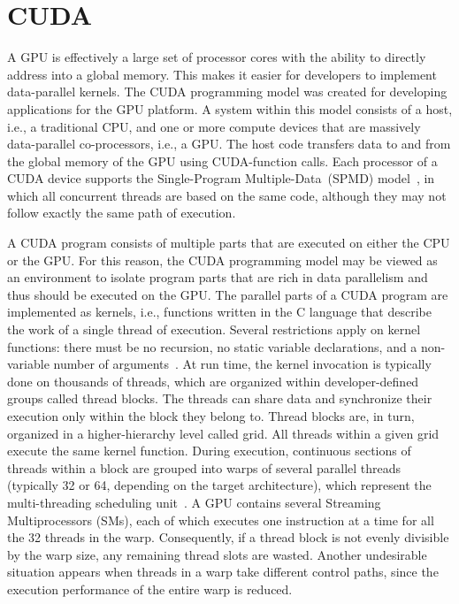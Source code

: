\section{CUDA \label{sec:02-CUDA}}

A GPU is effectively a large set of processor cores with the ability
to directly address into a global memory. This makes it easier for
developers to implement data-parallel kernels. The CUDA programming
model \cite{CUDA} was created for developing applications for the
GPU platform. A system within this model consists of a host, i.e.,
a traditional CPU, and one or more compute devices that are massively
data-parallel co-processors, i.e., a GPU. The host code transfers
data to and from the global memory of the GPU using CUDA-function
calls. Each processor of a CUDA device supports the Single-Program
Multiple-Data~(SPMD)
model~\cite{Atallah-Algorithms_and_theory_of_computation:2002},
in which all concurrent threads are based on the same code, although
they may not follow exactly the same path of execution.

A CUDA program consists of multiple parts that are executed on either
the CPU or the GPU. For this reason, the CUDA programming model may
be viewed as an environment to isolate program parts that are rich
in data parallelism and thus should be executed on the GPU. The parallel
parts of a CUDA program are implemented as kernels, i.e., functions
written in the C language that describe the work of a single thread
of execution. Several restrictions apply on kernel functions: there
must be no recursion, no static variable declarations, and a non-variable
number of arguments~\cite{Ryoo-Optimization_principles_of_a_GPU_using_CUDA:2008}.
At run time, the kernel invocation is typically done on thousands
of threads, which are organized within developer-defined groups called
thread blocks. The threads can share data and synchronize their execution
only within the block they belong to. Thread blocks are, in turn,
organized in a higher-hierarchy level called grid. All threads within
a given grid execute the same kernel function. During execution, continuous
sections of threads within a block are grouped into warps of several
parallel threads (typically 32 or 64, depending on the target architecture),
which represent the multi-threading scheduling unit~\cite{Ryoo-Optimization_principles_of_a_GPU_using_CUDA:2008}.
A GPU contains several Streaming Multiprocessors (SMs),
each of which executes one instruction at a time for all the 32 threads
in the warp. Consequently, if a thread block is not evenly divisible
by the warp size, any remaining thread slots are wasted. Another undesirable
situation appears when threads in a warp take different control paths,
since the execution performance of the entire warp is reduced.

